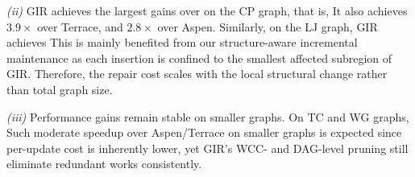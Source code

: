 \textit{(ii)} GIR achieves the largest gains over  
on the CP graph, that is,  
It also achieves $3.9\times$ over Terrace, and $2.8\times$ over Aspen.
Similarly, on the LJ graph, GIR achieves 
This is mainly benefited from our structure-aware incremental maintenance as each insertion is confined to the smallest affected subregion of GIR.
Therefore, the repair cost scales with the local structural change rather than total graph size.

\textit{(iii)} Performance gains remain stable on smaller graphs.
On TC and WG graphs, 
Such moderate speedup over Aspen/Terrace on smaller graphs is expected since per-update cost is inherently lower, yet GIR's WCC- and DAG-level pruning still eliminate redundant works consistently.



